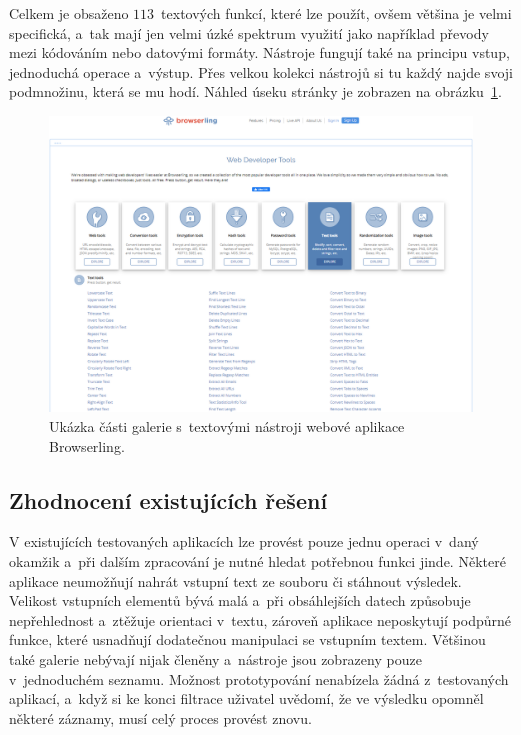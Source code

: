 Celkem je obsaženo $113$~textových funkcí, které lze použít, ovšem většina je velmi specifická, a~tak mají jen velmi úzké spektrum využití jako například převody mezi kódováním nebo datovými formáty. Nástroje fungují také na principu vstup, jednoduchá operace a~výstup. Přes velkou kolekci nástrojů si tu každý najde svoji podmnožinu, která se mu hodí. Náhled úseku stránky je zobrazen na obrázku~\ref{obr:Browserling}.
\begin{figure}[hbt]
	\centering
	\setlength{\fboxsep}{0pt}
	\includegraphics[width=1\textwidth]{obrazky-figures/browserling_prehled.png}
	\caption{Ukázka části galerie s~textovými nástroji webové aplikace Browserling.}
	\label{obr:Browserling}
\end{figure}

\subsection*{Zhodnocení existujících řešení}
V existujících testovaných aplikacích lze provést pouze jednu operaci v~daný okamžik a~při dalším zpracování je nutné hledat potřebnou funkci jinde. Některé aplikace neumožňují nahrát vstupní text ze souboru či stáhnout výsledek. Velikost vstupních elementů bývá malá a~při obsáhlejších datech způsobuje nepřehlednost a~ztěžuje orientaci v~textu, zároveň aplikace neposkytují podpůrné funkce, které usnadňují dodatečnou manipulaci se vstupním textem. Většinou také galerie nebývají nijak členěny a~nástroje jsou zobrazeny pouze v~jednoduchém seznamu. Možnost prototypování nenabízela žádná z~testovaných aplikací, a~když si ke konci filtrace uživatel uvědomí, že ve výsledku opomněl některé záznamy, musí celý proces provést znovu.


